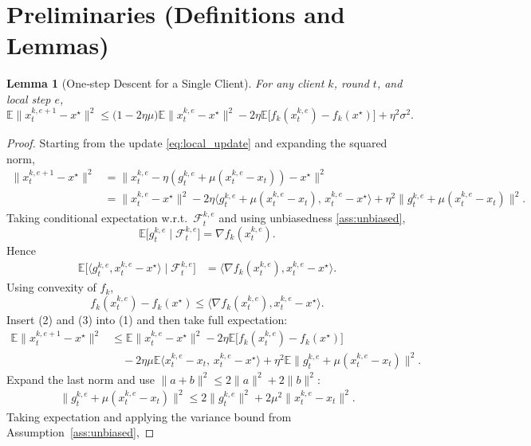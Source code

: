 \documentclass{article}
\newtheorem{lemma}{Lemma}
\newcommand{\E}{\mathbb{E}}
\begin{document}
\newpage
\section*{Preliminaries (Definitions and Lemmas)}
\begin{lemma}[One‑step Descent for a Single Client]\label{lem:one_step}
For any client $k$, round $t$, and local step $e$,
\[
\E\!\bigl\|x_{t}^{k,e+1}-x^{\star}\bigr\|^{2}
\le
\bigl(1-2\eta\mu\bigr)\E\!\bigl\|x_{t}^{k,e}-x^{\star}\bigr\|^{2}
-2\eta\E\!\bigl[f_k(x_{t}^{k,e})-f_k(x^{\star})\bigr]
+\eta^{2}\sigma^{2}.
\]
\end{lemma}
\begin{proof}
Starting from the update \eqref{eq:local_update} and expanding the squared norm,
\begin{align}
\|x_{t}^{k,e+1}-x^{\star}\|^{2}
&=\|x_{t}^{k,e}-\eta(g_{t}^{k,e}+\mu(x_{t}^{k,e}-x_t))-x^{\star}\|^{2}\nonumber\\
&=\|x_{t}^{k,e}-x^{\star}\|^{2}
-2\eta\langle g_{t}^{k,e}+\mu(x_{t}^{k,e}-x_t),\,x_{t}^{k,e}-x^{\star}\rangle
+\eta^{2}\|g_{t}^{k,e}+\mu(x_{t}^{k,e}-x_t)\|^{2}. \tag{1}
\end{align}
Taking conditional expectation w.r.t.\ $\mathcal{F}_{t}^{k,e}$ and using unbiasedness
\eqref{ass:unbiased},
\[
\E\!\bigl[g_{t}^{k,e}\mid\mathcal{F}_{t}^{k,e}\bigr]=\nabla f_k(x_{t}^{k,e}).
\]
Hence
\begin{align}
\E\!\bigl[\langle g_{t}^{k,e},x_{t}^{k,e}-x^{\star}\rangle\mid\mathcal{F}_{t}^{k,e}\bigr]
&=\langle\nabla f_k(x_{t}^{k,e}),x_{t}^{k,e}-x^{\star}\rangle. \tag{2}
\end{align}
Using convexity of $f_k$,
\[
f_k(x_{t}^{k,e})-f_k(x^{\star})\le
\langle\nabla f_k(x_{t}^{k,e}),x_{t}^{k,e}-x^{\star}\rangle. \tag{3}
\]
Insert (2) and (3) into (1) and then take full expectation:
\begin{align}
\E\!\bigl\|x_{t}^{k,e+1}-x^{\star}\|^{2}
&\le
\E\!\|x_{t}^{k,e}-x^{\star}\|^{2}
-2\eta\E\!\bigl[f_k(x_{t}^{k,e})-f_k(x^{\star})\bigr] \nonumber\\
&\quad-2\eta\mu\E\!\langle x_{t}^{k,e}-x_t,\,x_{t}^{k,e}-x^{\star}\rangle
+\eta^{2}\E\!\|g_{t}^{k,e}+\mu(x_{t}^{k,e}-x_t)\|^{2}. \tag{4}
\end{align}
Expand the last norm and use $\|a+b\|^{2}\le2\|a\|^{2}+2\|b\|^{2}$:
\begin{align}
\|g_{t}^{k,e}+\mu(x_{t}^{k,e}-x_t)\|^{2}
\le2\|g_{t}^{k,e}\|^{2}+2\mu^{2}\|x_{t}^{k,e}-x_t\|^{2}. \tag{5}
\end{align}
Taking expectation and applying the variance bound from Assumption~\ref{ass:unbiased},

\end{proof}
\end{document}
